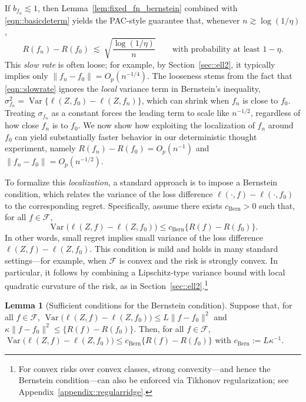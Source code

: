 \documentclass[11pt]{article}
\theoremstyle{plain}
\theoremstyle{definition} %
\newtheorem{lemma}{Lemma}
\newcommand{\Var}{\operatorname{Var}}
\begin{document}
If \(b_{f_n}\lesssim 1\), then Lemma~\ref{lem:fixed_fn_bernstein} combined with
\eqref{eqn::basicdeterm} yields the PAC-style guarantee that, whenever
\(n\gtrsim \log(1/\eta)\),
\begin{equation}
\label{eqn::slowrate}
R(f_n)-R(f_0)
\ \lesssim\
\sqrt{\frac{\log(1/\eta)}{n}}
\qquad\text{with probability at least }1-\eta.
\end{equation}
This \emph{slow rate} is often loose; for example, by Section~\ref{sec::ell2}, it typically implies only
\(\|f_n-f_0\|=O_p(n^{-1/4})\).
The looseness stems from the fact that \eqref{eqn::slowrate} ignores the \emph{local} variance term in Bernstein's inequality,
\(\sigma_{f_n}^2=\Var\{\ell(Z,f_0)-\ell(Z,f_n)\}\),
which can shrink when \(f_n\) is close to \(f_0\).
Treating \(\sigma_{f_n}\) as a constant forces the leading term to scale like \(n^{-1/2}\), regardless of how close \(f_n\) is to \(f_0\).
We now show how exploiting the localization of \(f_n\) around \(f_0\) can yield substantially faster behavior in our deterministic thought experiment, namely \(R(f_n)-R(f_0)=O_p(n^{-1})\) and \(\|f_n-f_0\|=O_p(n^{-1/2})\).

To formalize this \emph{localization}, a standard approach is to impose a
Bernstein condition, which relates the variance of the loss difference
\(\ell(\cdot,f)-\ell(\cdot,f_0)\) to the corresponding regret. Specifically, assume there exists \(c_{\mathrm{Bern}}>0\) such that, for all \(f\in\mathcal F\),
\begin{equation}
\label{eq:bernstein_condition}
\Var\bigl(\ell(Z,f)-\ell(Z,f_0)\bigr)\le c_{\mathrm{Bern}}\{R(f)-R(f_0)\}.
\end{equation}
In other words, small regret implies small variance of the loss difference \(\ell(Z,f)-\ell(Z,f_0)\). This condition is mild and holds in many standard settings—for example, when
\(\mathcal F\) is convex and the risk is strongly convex. In particular, it
follows by combining a Lipschitz-type variance bound with local quadratic
curvature of the risk, as in Section~\ref{sec::ell2}.\footnote{For convex risks
over convex classes, strong convexity---and hence the Bernstein condition---can
also be enforced via Tikhonov regularization; see
Appendix~\ref{appendix::regularridge}.}



\begin{lemma}[Sufficient conditions for the Bernstein condition]
\label{lemma::suffbern}
Suppose that, for all \(f\in\mathcal{F}\), \(\Var\bigl(\ell(Z,f)-\ell(Z,f_0)\bigr)\le L\|f-f_0\|^2\) and \(\kappa \|f-f_0\|^2\le \{R(f)-R(f_0)\}\). Then, for all \(f\in\mathcal{F}\), \(\Var\bigl(\ell(Z,f)-\ell(Z,f_0)\bigr)\le c_{\mathrm{Bern}}   \{R(f)-R(f_0)\}\) with $c_{\mathrm{Bern}} := L \kappa^{-1}$.
\end{lemma}
\end{document}
